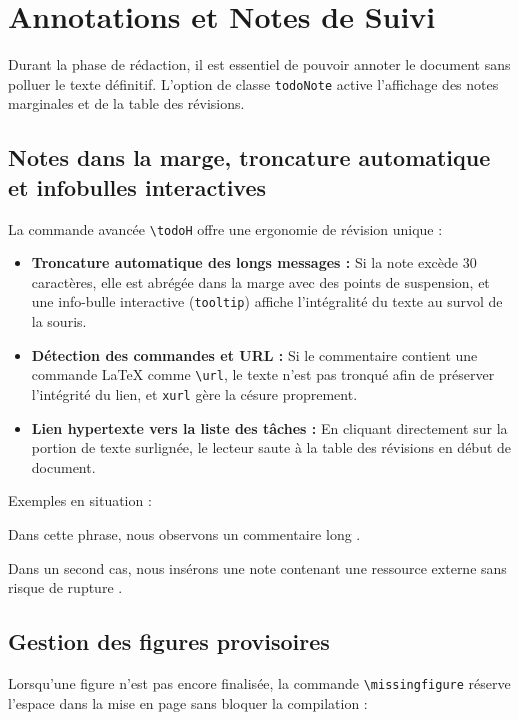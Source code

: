 \section{Annotations et Notes de Suivi}
\label{sec:todos}

Durant la phase de rédaction, il est essentiel de pouvoir annoter le document sans polluer le texte définitif.
L'option de classe \texttt{todoNote} active l'affichage des notes marginales et de la table des révisions.

\subsection{Notes dans la marge, troncature automatique et infobulles interactives}
\label{subsec:notes_marge}

La commande avancée \texttt{\textbackslash todoH} offre une ergonomie de révision unique :
\begin{itemize}
  \item \textbf{Troncature automatique des longs messages :} Si la note excède 30 caractères, elle est abrégée dans la marge avec des points de suspension, et une info-bulle interactive (\texttt{tooltip}) affiche l'intégralité du texte au survol de la souris.
  \item \textbf{Détection des commandes et URL :} Si le commentaire contient une commande LaTeX comme \texttt{\textbackslash url}, le texte n'est pas tronqué afin de préserver l'intégrité du lien, et \texttt{xurl} gère la césure proprement.
  \item \textbf{Lien hypertexte vers la liste des tâches :} En cliquant directement sur la portion de texte surlignée, le lecteur saute à la table des révisions en début de document.
\end{itemize}

Exemples en situation :

Dans cette phrase, nous observons un commentaire long .

Dans un second cas, nous insérons une note contenant une ressource externe sans risque de rupture .

\subsection{Gestion des figures provisoires}
\label{subsec:missing_figures}

Lorsqu'une figure n'est pas encore finalisée, la commande \texttt{\textbackslash missingfigure} réserve l'espace dans la mise en page sans bloquer la compilation :

